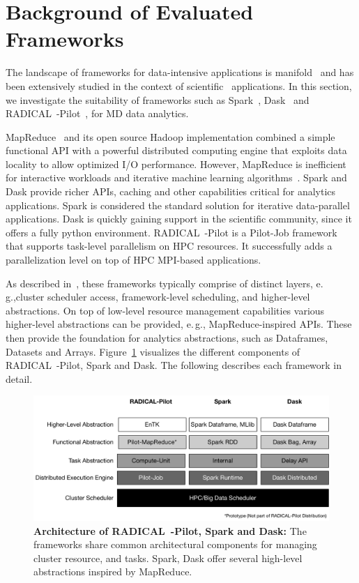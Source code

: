 \section{Background of Evaluated Frameworks}
\label{frameworks}
The landscape of frameworks for data-intensive applications is manifold~\cite{jha2014tale,kamburugamuve2017anatomy} and has been extensively studied in the context of scientific~\cite{jha2017introducing} applications.
In this section, we investigate the suitability of frameworks such as Spark~\cite{zaharia2010spark}, Dask~\cite{rocklin2015dask} and RADICAL~-Pilot~\cite{merzky2019using}, for MD data analytics.

MapReduce~\cite{dean2004mapreduce} and its open source Hadoop implementation combined a simple functional API with a powerful distributed computing engine that exploits data locality to allow optimized I/O performance.
However, MapReduce is inefficient for interactive workloads and iterative machine learning algorithms~\cite{zaharia2010spark,ekanayake2010twister}.
Spark and Dask provide richer APIs, caching and other capabilities critical for analytics applications.
Spark is considered the standard solution for iterative data-parallel applications.
Dask is quickly gaining support in the scientific community, since it offers a fully python environment.
RADICAL~-Pilot is a Pilot-Job framework~\cite{luckow2012pstar} that supports task-level parallelism on HPC resources.
It successfully adds a parallelization level on top of HPC MPI-based applications.

As described in~\cite{jha2014tale}, these frameworks typically comprise of distinct layers, e.\,g.,cluster scheduler access, framework-level scheduling, and higher-level abstractions.
On top of low-level resource management capabilities various higher-level abstractions can be provided, e.\,g., MapReduce-inspired APIs.
These then provide the foundation for analytics abstractions, such as Dataframes, Datasets and Arrays.
Figure~\ref{fig:figures_bigdata_framework_stack} visualizes the different components of RADICAL~-Pilot, Spark and Dask.
The following describes each framework in detail.

\begin{figure}[ht]
    \centering
    \includegraphics[width=.95\textwidth]{figures/data_analytics_hpc/task_par/bigdata_framework_stack.pdf}
    \caption{\textbf{Architecture of RADICAL~-Pilot, Spark and Dask:}
    The frameworks share common architectural components for managing cluster resource, and tasks.
    Spark, Dask offer several high-level abstractions inspired by MapReduce.}
    \label{fig:figures_bigdata_framework_stack}
\end{figure}

